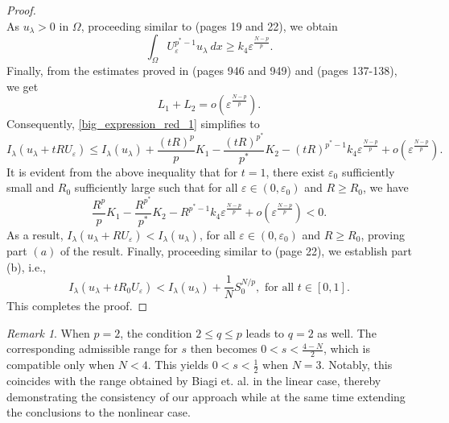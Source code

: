\documentclass[reqno,oneside]{amsart}
\theoremstyle{definition}
\theoremstyle{remark}
\newtheorem{remark}[theorem]{Remark}
\numberwithin{equation}{section}
\newcommand{\Om} {\Omega}
\newcommand{\ue}{U_{\varepsilon}}
\newcommand{\la} {\lambda}
\begin{document}
\begin{proof}
\begin{equation}
    \end{equation}
    As $u_{\la} > 0$ in $\Om$, proceeding similar to \cite{bhakta2025quasilinearproblemsmixedlocalnonlocal} (pages 19 and 22), we obtain
    \begin{equation}
        \int_{\Om} \ue^{p^* -1} u_{\la}\ dx \geq k_4 \varepsilon^{\frac{N-p}{p}}.
    \end{equation}
    Finally, from the estimates proved in \cite{garciaperal1994critical} (pages 946 and 949) and \cite{giacomoni2007sobolev} (pages 137-138), we get
    \begin{equation}
        L_1 + L_2 =  o\left( \varepsilon^{\frac{N-p}{p}} \right).
    \end{equation}
    Consequently, \eqref{big_expression_red_1} simplifies to
    \begin{equation}
        I_{\la} \left( u_{\la} + tR\ue\right) \leq I_{\la} (u_{\la}) + \frac{(tR)^p}{p} K_1 -\frac{(tR)^{p^*}}{p^*} K_2 - (tR)^{p^* -1} k_4 \varepsilon^{\frac{N-p}{p}} + o\left( \varepsilon^{\frac{N-p}{p}} \right).
    \end{equation}
    It is evident from the above inequality that for $t=1$, there exist $\varepsilon_0$ sufficiently small and $R_0$ sufficiently large such that for all $\varepsilon \in (0, \varepsilon_0)$ and $R\geq R_0$, we have
    \[ \frac{R^p}{p} K_1 -\frac{R^{p^*}}{p^*} K_2 - R^{p^* -1} k_4 \varepsilon^{\frac{N-p}{p}} + o\left( \varepsilon^{\frac{N-p}{p}} \right) < 0. \]
    As a result, $I_{\la} \left( u_{\la} + R\ue\right) < I_{\la} (u_{\la})$, for all $\varepsilon \in (0, \varepsilon_0)$ and $R\geq R_0$, proving part $(a)$ of the result. Finally, proceeding similar to \cite{bhakta2025quasilinearproblemsmixedlocalnonlocal} (page 22), we establish part (b), i.e.,
    \[I_{\la} \left( u_{\la} + t R_0 \ue\right) < I_{\la} \left( u_{\la} \right) + \frac{1}{N} S_0^{N/p}, \text{ for all } t\in[0,1]. \]
     This completes the proof.
\end{proof}

\begin{remark}
    When $p=2$, the condition $2 \leq q \leq p$ leads to $q=2$ as well. The corresponding admissible range for $s$ then becomes $0<s< \frac{4-N}{2}$, which is compatible only when $N<4.$ This  yields $0<s<\frac{1}{2}$ when $N=3.$ Notably, this coincides with the range obtained by Biagi et. al. \cite{biagi2024critical} in the linear case, thereby demonstrating the consistency of our approach while at the same time extending the conclusions to the nonlinear case.
\end{remark}
\end{document}
